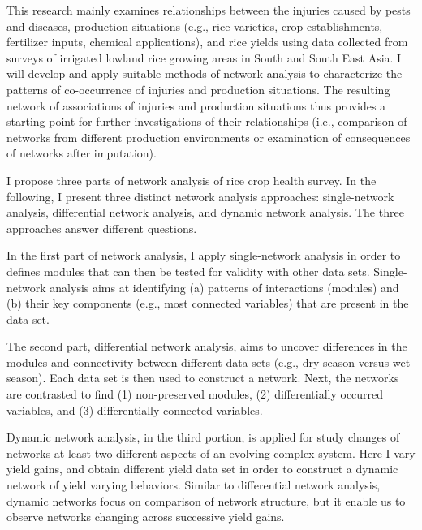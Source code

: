 

This research mainly examines relationships between the injuries caused by pests and diseases, production situations (e.g., rice varieties, crop establishments, fertilizer inputs, chemical applications), and rice yields using data collected from surveys of irrigated lowland rice growing areas in South and South East Asia. I will develop and apply suitable methods of network analysis to characterize the patterns of co-occurrence of injuries and production situations. The resulting network of associations of injuries and production situations thus provides a starting point for further investigations of their relationships (i.e., comparison of networks from different production environments or examination of consequences of networks after imputation).

I propose three parts of network analysis of rice crop health survey. In the following, I present three distinct network analysis approaches: single-network analysis, differential network analysis, and dynamic network analysis. The three approaches answer different questions. 

In the first part of network analysis, I apply single-network analysis in order to defines modules that can then be tested for validity with other data sets. Single-network analysis aims at identifying (a) patterns of interactions (modules) and (b) their key components (e.g., most connected variables) that are present in the data set.

The second part, differential network analysis, aims to uncover differences in the modules and connectivity between different data sets (e.g., dry season versus wet season). Each data set is then used to construct a network. Next, the networks are contrasted to find (1) non-preserved modules, (2) differentially occurred variables, and (3) differentially connected variables. 


Dynamic network analysis, in the third portion, is applied for study changes of networks at least two different aspects of an evolving complex system. Here I vary yield gains, and obtain different yield data set in order to construct a dynamic network of yield varying behaviors. Similar to differential network analysis, dynamic networks focus on comparison of network structure, but it enable us to observe networks changing across successive yield gains. 


